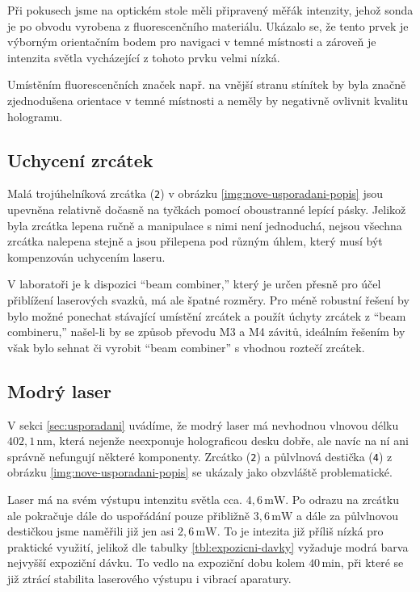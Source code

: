 \documentclass[twoside,project]{../MFFPrace}
\begin{document}
Při pokusech jsme na optickém stole měli připravený měřák intenzity, jehož sonda je po obvodu vyrobena z fluorescenčního materiálu. Ukázalo se, že tento prvek je výborným orientačním bodem pro navigaci v temné místnosti a zároveň je intenzita světla vycházející z tohoto prvku velmi nízká.

Umístěním fluorescenčních značek např. na vnější stranu stínítek by byla značně zjednodušena orientace v temné místnosti a neměly by negativně ovlivnit kvalitu hologramu.

\subsection*{Uchycení zrcátek}
Malá trojúhelníková zrcátka (\texttt{2}) v obrázku \ref{img:nove-usporadani-popis} jsou upevněna relativně dočasně na tyčkách pomocí oboustranné lepící pásky. Jelikož byla zrcátka lepena ručně a manipulace s nimi není jednoduchá, nejsou všechna zrcátka nalepena stejně a jsou přilepena pod různým úhlem, který musí být kompenzován uchycením laseru.

V laboratoři je k dispozici "`beam combiner,"' který je určen přesně pro účel přiblížení laserových svazků, má ale špatné rozměry. Pro méně robustní řešení by bylo možné ponechat stávající umístění zrcátek a použít úchyty zrcátek z "`beam combineru,"' našel-li by se způsob převodu M3 a M4 závitů, ideálním řešením by však bylo sehnat či vyrobit "`beam combiner"' s vhodnou roztečí zrcátek.

\subsection*{Modrý laser}
V sekci \ref{sec:usporadani} uvádíme, že modrý laser má nevhodnou vlnovou délku $402{,}1\,\text{nm}$, která nejenže neexponuje holograficou desku dobře, ale navíc na ní ani správně nefungují některé komponenty. Zrcátko (\texttt{2}) a půlvlnová destička (\texttt{4}) z obrázku \ref{img:nove-usporadani-popis} se ukázaly jako obzvláště problematické.

Laser má na svém výstupu intenzitu světla cca. $4{,}6\,\text{mW}$. Po odrazu na zrcátku ale pokračuje dále do uspořádání pouze přibližně $3{,}6\,\text{mW}$ a dále za půlvlnovou destičkou jsme naměřili již jen asi $2{,}6\,\text{mW}$. To je intezita již příliš nízká pro praktické využití, jelikož dle tabulky \ref{tbl:expozicni-davky} vyžaduje modrá barva nejvyšší expoziční dávku. To vedlo na expoziční dobu kolem $40\,\text{min}$, při které se již ztrácí stabilita laserového výstupu i vibrací aparatury.
\end{document}
